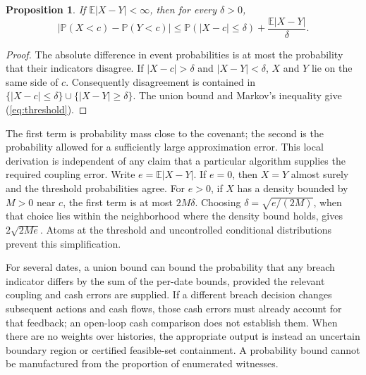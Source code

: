 \documentclass[11pt,a4paper]{article}
\newtheorem{proposition}{Proposition}
\newcommand{\E}{\mathbb E}
\newcommand{\Prob}{\mathbb P}
\begin{document}
\begin{proposition}
If $\E|X-Y|<\infty$, then for every $\delta>0$,
\begin{equation}\label{eq:threshold}
|\Prob(X<c)-\Prob(Y<c)|
\leq \Prob(|X-c|\leq\delta)+\frac{\E|X-Y|}{\delta}.
\end{equation}
\end{proposition}
\begin{proof}
The absolute difference in event probabilities is at most the probability
that their indicators disagree. If $|X-c|>\delta$ and $|X-Y|<\delta$, $X$
and $Y$ lie on the same side of $c$. Consequently disagreement is contained
in $\{|X-c|\leq\delta\}\cup\{|X-Y|\geq\delta\}$. The union bound
and Markov's inequality give (\ref{eq:threshold}).
\end{proof}
The first term is probability mass close to the covenant; the second is the
probability allowed for a sufficiently large approximation error. This local
derivation is independent of any claim that a particular algorithm supplies
the required coupling error. Write $e=\E|X-Y|$. If $e=0$, then $X=Y$ almost surely and the threshold probabilities agree.
For $e>0$, if $X$ has a density bounded by $M>0$ near $c$,
the first term is at most $2M\delta$. Choosing
$\delta=\sqrt{e/(2M)}$, when that choice lies within the neighborhood where
the density bound holds, gives $2\sqrt{2Me}$. Atoms at the threshold and
uncontrolled conditional distributions prevent this simplification.

For several dates, a union bound can bound the probability that any breach
indicator differs by the sum of the per-date bounds, provided the relevant
coupling and cash errors are supplied. If a different breach decision changes
subsequent actions and cash flows, those cash errors must already account for
that feedback; an open-loop cash comparison does not establish them. When
there are no weights over histories, the appropriate output is instead an
uncertain boundary region or certified feasible-set containment. A probability
bound cannot be manufactured from the proportion of enumerated witnesses.
\end{document}
